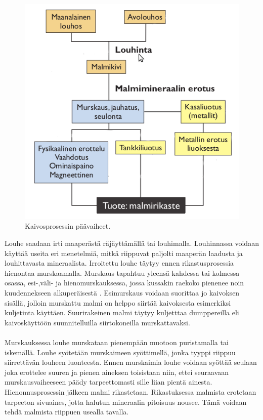 \documentclass[finnish,12pt,a4paper,pdftex,elec,utf8]{aaltothesis}
\begin{document}
\begin{figure}[H]
	\begin{center}
	\includegraphics{Kaivosprosessi}
	\end{center}
	\caption{Kaivosprosessin päävaiheet.
		\cite{Kaivosprosessi}}
	\label{fig:Kaivosprosessi}
	
\end{figure}
\noindent
Louhe saadaan irti maaperästä räjäyttämällä tai louhimalla. Louhinnassa voidaan käyttää useita eri menetelmiä, mitkä riippuvat paljolti maaperän laadusta ja louhittavasta mineraalista. Irroitettu louhe täytyy ennen rikastusprosessia hienontaa murskaamalla. Murskaus tapahtuu yleensä kahdessa tai kolmessa osassa, esi-,väli- ja hienomurskauksessa, jossa kussakin raekoko pienenee noin kuudennekseen alkuperäisestä \cite[s. 198]{Hakapää}. Esimurskaus voidaan suorittaa jo kaivoksen sisällä, jolloin murskattu malmi on helppo siirtää kaivoksesta esimerkiksi kuljetinta käyttäen. Suurirakeinen malmi täytyy kuljetttaa dumppereilla eli kaivoskäyttöön suunnitelluilla siirtokoneilla murskattavaksi. 
\\\\
Murskauksessa louhe murskataan pienempään muotoon puristamalla tai iskemällä. Louhe syötetään murskaimeen syöttimellä, jonka tyyppi riippuu siirrettävän louheen luonteesta. Ennen murskaimia louhe voidaan syöttää seulaan joka erottelee suuren ja pienen aineksen toisistaan niin, ettei seuraavaan murskausvaiheeseen päädy tarpeettomasti sille liian pientä ainesta. Hienonnusprosessin jälkeen malmi rikastetaan. Rikastuksessa malmista erotetaan tarpeeton sivuaines, jotta halutun mineraalin pitoisuus nousee. Tämä voidaan tehdä malmista riippuen usealla tavalla. \cite[s. 197-199]{Hakapää}
\end{document}

